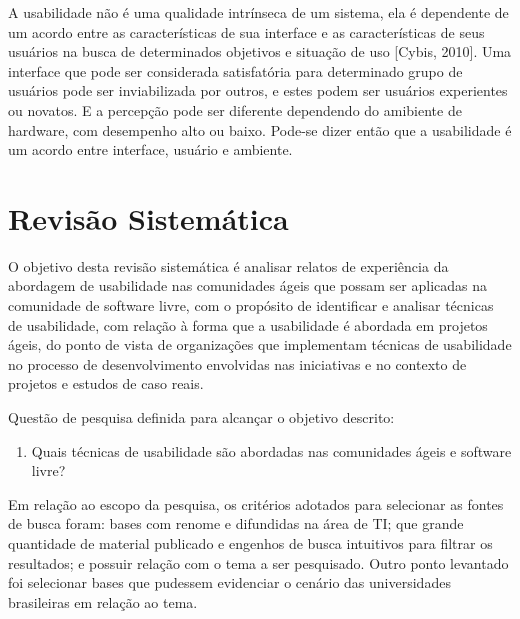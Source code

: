 \documentclass[12pt]{article}
\begin{document}
%
A usabilidade não é uma qualidade intrínseca de um sistema, ela é dependente de um acordo entre as características de sua interface e as características de seus usuários na busca de determinados objetivos e situação de uso [Cybis, 2010]. Uma interface que pode ser considerada satisfatória para determinado grupo de usuários pode ser inviabilizada por outros, e estes podem ser usuários experientes ou novatos. E a percepção pode ser diferente dependendo do amibiente de hardware, com desempenho alto ou baixo. Pode-se dizer então que a usabilidade é um acordo entre interface, usuário e ambiente.


\section{Revisão Sistemática}
\label{sec:rev_sis}

O objetivo desta revisão sistemática é analisar relatos de experiência da abordagem de usabilidade nas comunidades ágeis que possam ser aplicadas na comunidade de software livre, com o propósito de identificar e analisar técnicas de usabilidade, com relação à forma que a usabilidade é abordada em projetos ágeis, do ponto de vista de organizações que implementam técnicas de usabilidade no processo de desenvolvimento envolvidas nas iniciativas e no contexto de projetos e estudos de caso reais.
%

Questão de pesquisa definida para alcançar o objetivo descrito:

\begin{enumerate}
\item Quais técnicas de usabilidade são abordadas nas comunidades ágeis e software livre?
\end{enumerate}

Em relação ao escopo da pesquisa, os critérios adotados para selecionar as fontes de busca foram: bases com renome e difundidas na área de TI; que grande quantidade de material publicado e engenhos de busca intuitivos para filtrar os resultados; e possuir relação com o tema a ser pesquisado. Outro ponto levantado foi selecionar bases que pudessem evidenciar o cenário das universidades brasileiras em relação ao tema.
\end{document}
